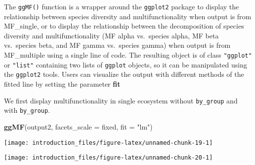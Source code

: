 \documentclass[
]{article}
\newenvironment{Shaded}{\begin{snugshade}}{\end{snugshade}}
\newcommand{\AttributeTok}[1]{\textcolor[rgb]{0.13,0.29,0.53}{#1}}
\newcommand{\FunctionTok}[1]{\textcolor[rgb]{0.13,0.29,0.53}{\textbf{#1}}}
\newcommand{\NormalTok}[1]{#1}
\newcommand{\OtherTok}[1]{\textcolor[rgb]{0.56,0.35,0.01}{#1}}
\newcommand{\SpecialCharTok}[1]{\textcolor[rgb]{0.81,0.36,0.00}{\textbf{#1}}}
\newcommand{\StringTok}[1]{\textcolor[rgb]{0.31,0.60,0.02}{#1}}
\begin{document}
The \texttt{ggMF()} function is a wrapper around the \texttt{ggplot2}
package to display the relationship between species diversity and
multifunctionality when output is from MF\_single, or to display the
relationship between the decomposition of species diversity and
multifunctionality (MF alpha vs.~species alpha, MF beta vs.~species
beta, and MF gamma vs.~species gamma) when output is from MF\_multiple
using a single line of code. The resulting object is of class
\texttt{"ggplot"} or \texttt{"list"} containing two lists of
\texttt{ggplot} objects, so it can be manipulated using the
\texttt{ggplot2} tools. Users can visualize the output with different
methods of the fitted line by setting the parameter \textbf{fit}

We first display multifunctionality in single ecosystem without
\texttt{by\_group} and with \texttt{by\_group}.

\begin{Shaded}
\begin{Highlighting}[]
\FunctionTok{ggMF}\NormalTok{(output2, }\AttributeTok{facets\_scale =} \StringTok{\textquotesingle{}fixed\textquotesingle{}}\NormalTok{, }\AttributeTok{fit =} \StringTok{"lm"}\NormalTok{)}
\end{Highlighting}
\end{Shaded}

\begin{center}\texttt{[image: introduction\_files/figure-latex/unnamed-chunk-19-1]} \end{center}

\begin{Shaded}
\end{Shaded}

\begin{center}\texttt{[image: introduction\_files/figure-latex/unnamed-chunk-20-1]} \end{center}
\end{document}
